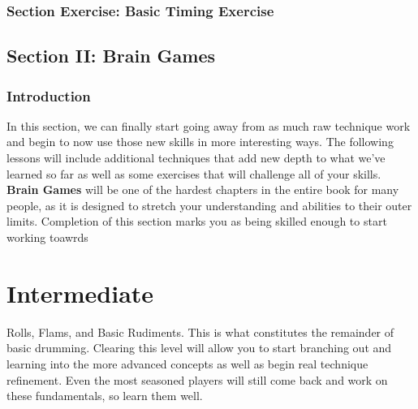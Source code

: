 \documentclass[12pt,letterpaper]{book}
\begin{document}
\section{Section Exercise: Basic Timing Exercise}

\chapter{Section II: Brain Games}

\section{Introduction}

In this section, we can finally start going away from as much raw technique work and begin to now use those new skills in more interesting ways. The following lessons will include additional techniques that add new depth to what we've learned so far as well as some exercises that will challenge all of your skills.  \textbf{Brain Games} will be one of the hardest chapters in the entire book for many people, as it is designed to stretch your understanding and abilities to their outer limits. Completion of this section marks you as being skilled enough to start working toawrds 


\part{Intermediate}

Rolls, Flams, and Basic Rudiments. This is what constitutes the remainder of basic drumming. Clearing this level will allow you to start branching out and learning into the more advanced concepts as well as begin real technique refinement. Even the most seasoned players will still come back and work on these fundamentals, so learn them well.
\end{document}
